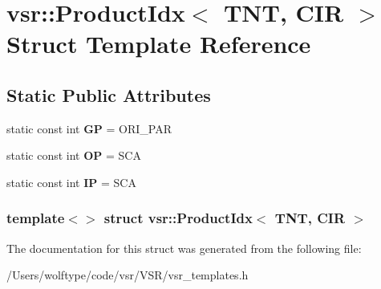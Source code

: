 \hypertarget{structvsr_1_1_product_idx_3_01_t_n_t_00_01_c_i_r_01_4}{\section{vsr\-:\-:Product\-Idx$<$ T\-N\-T, C\-I\-R $>$ Struct Template Reference}
\label{structvsr_1_1_product_idx_3_01_t_n_t_00_01_c_i_r_01_4}
}
\subsection*{Static Public Attributes}
\begin{DoxyCompactItemize}
\item 
\hypertarget{structvsr_1_1_product_idx_3_01_t_n_t_00_01_c_i_r_01_4_a3fe46e4ed6a036e810dd37678eddada3}{static const int {\bfseries G\-P} = O\-R\-I\-\_\-\-P\-A\-R}\label{structvsr_1_1_product_idx_3_01_t_n_t_00_01_c_i_r_01_4_a3fe46e4ed6a036e810dd37678eddada3}

\item 
\hypertarget{structvsr_1_1_product_idx_3_01_t_n_t_00_01_c_i_r_01_4_afd0ba199faebce23eff785ddb87c8b13}{static const int {\bfseries O\-P} = S\-C\-A}\label{structvsr_1_1_product_idx_3_01_t_n_t_00_01_c_i_r_01_4_afd0ba199faebce23eff785ddb87c8b13}

\item 
\hypertarget{structvsr_1_1_product_idx_3_01_t_n_t_00_01_c_i_r_01_4_a4c90ca952c5b8eb68496b7569d982822}{static const int {\bfseries I\-P} = S\-C\-A}\label{structvsr_1_1_product_idx_3_01_t_n_t_00_01_c_i_r_01_4_a4c90ca952c5b8eb68496b7569d982822}

\end{DoxyCompactItemize}
\subsubsection*{template$<$$>$ struct vsr\-::\-Product\-Idx$<$ T\-N\-T, C\-I\-R $>$}



The documentation for this struct was generated from the following file\-:\begin{DoxyCompactItemize}
\item 
/\-Users/wolftype/code/vsr/\-V\-S\-R/vsr\-\_\-templates.\-h\end{DoxyCompactItemize}
